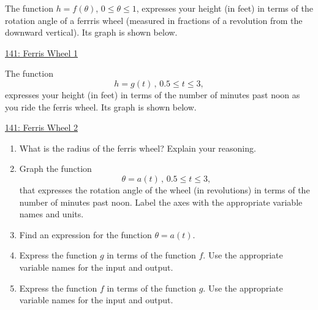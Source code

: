 \documentclass{ximera}
\begin{document}
\begin{question} \label{Q9d9r3mdf32}
The function $h=f(\theta)$, $0\leq \theta \leq 1$, expresses your height (in feet) in terms of the rotation angle of a ferrris wheel (measured in fractions of a revolution from the downward vertical). Its graph is shown below.

\begin{onlineOnly}
    \begin{center}
\end{center}
\end{onlineOnly}

\href{https://www.desmos.com/calculator/olrqe90xht}{141: Ferris Wheel 1}

The function
\[
   h = g(t) \, , \, 0.5 \leq t \leq 3 ,
\]
expresses your height (in feet) in terms of the number of minutes past noon as you ride the ferris wheel. Its graph is shown below.

\begin{onlineOnly}
    \begin{center}
\end{center}
\end{onlineOnly}

\href{https://www.desmos.com/calculator/szsqtovplg}{141: Ferris Wheel 2}

\begin{enumerate}
\item What is the radius of the ferris wheel? Explain your reasoning.

\item Graph the function
\[
       \theta = a(t) \, , \, 0.5 \leq t \leq 3 ,
\]
that expresses the rotation angle of the wheel (in revolutions) in terms of the number of minutes past noon. Label the axes with the appropriate variable names and units.

\item Find an expression for the function $\theta=a(t)$.

\item Express the function $g$ in terms of the function $f$. Use the appropriate variable names for the input and output.

\item Express the function $f$ in terms of the function $g$. Use the appropriate variable names for the input and output.
\end{enumerate}
\end{question}
\end{document}
